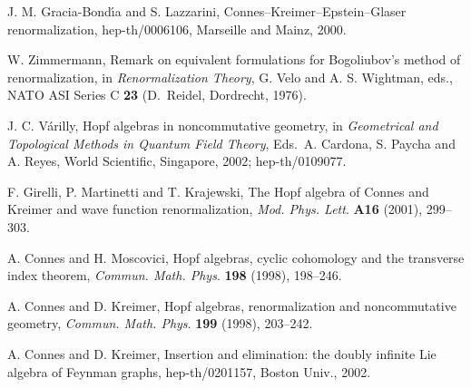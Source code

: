 \documentclass[a4paper,12pt]{article}
\providecommand{\1}{\mathbf{1}}         %
\providecommand{\7}{\dagger}            %
\providecommand{\8}{\bullet}            %
\renewcommand{\.}{\cdot}            %
\renewcommand{\:}{\colon}           %
\begin{document}
\begin{thebibliography}{74}
J. M. Gracia-Bond\'{\i}a and S. Lazzarini,
Connes--Kreimer--Epstein--Glaser renormalization,
hep-th/0006106, Marseille and Mainz, 2000.

W. Zimmermann,
Remark on equivalent formulations for Bogoliubov's method of
renormalization,
in \textit{Renormalization Theory},
G. Velo and A. S. Wightman, eds.,
NATO ASI Series C {\bf 23} (D.~Reidel, Dordrecht, 1976).

J. C. V\'arilly,
Hopf algebras in noncommutative geometry,
in
\textit{Geometrical and Topological Methods in Quantum Field Theory},
Eds.\ A. Cardona, S. Paycha and A. Reyes, 
World Scientific, Singapore, 2002;
hep-th/0109077.

F. Girelli, P. Martinetti and T. Krajewski,
The Hopf algebra of Connes and Kreimer and wave function
renormalization,
\textit{Mod. Phys. Lett}. {\bf A16} (2001), 299--303.

A. Connes and H. Moscovici,
Hopf algebras, cyclic cohomology and the transverse index theorem,
\textit{Commun. Math. Phys}. {\bf 198} (1998), 198--246.

A. Connes and D. Kreimer,
Hopf algebras, renormalization and noncommutative geometry,
\textit{Commun. Math. Phys}. {\bf 199} (1998), 203--242.

A. Connes and D. Kreimer,
Insertion and elimination: the doubly infinite Lie algebra of
Feynman graphs,
hep-th/0201157, Boston Univ., 2002.

\end{thebibliography}
\end{document}
